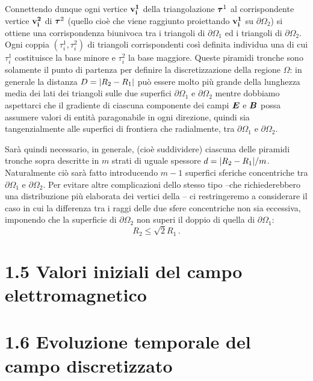 Connettendo dunque ogni vertice $\vb{v^1_i}$ della triangolazione $\vb*{\tau}^1$ al corrispondente vertice $\vb{v^2_i}$ di $\vb*{\tau}^2$ (quello cioè che viene raggiunto proiettando $\vb{v^1_i}$ su $\partial \Omega_2$) si ottiene una corrispondenza biunivoca tra i triangoli di $\partial \Omega_1$ ed i triangoli di $\partial \Omega_2$. Ogni coppia $(\tau^1_i, \tau^2_i)$ di triangoli corrispondenti così definita individua una  di cui $\tau^1_i$ costituisce la base minore e $\tau^2_i$ la base maggiore. Queste piramidi tronche sono solamente il punto di partenza per definire la discretizzazione della regione $\Omega$: in generale la distanza $D = \abs{R_2 - R_1}$ può essere molto più grande della lunghezza media dei lati dei triangoli sulle due superfici $\partial \Omega_1$ e $\partial \Omega_2$ mentre dobbiamo aspettarci che il gradiente di ciascuna componente dei campi $\vb*{E}$ e $\vb*{B}$ possa assumere valori di entità paragonabile in ogni direzione, quindi sia tangenzialmente alle superfici di frontiera che radialmente, tra $\partial \Omega_1$ e $\partial \Omega_2$.    

Sarà quindi necessario, in generale,  (cioè suddividere) ciascuna delle piramidi tronche sopra descritte in $m$ strati di uguale spessore $d  = \abs{R_2 - R_1}/m$. Naturalmente ciò sarà fatto introducendo $m-1$ superfici sferiche concentriche tra        
$\partial \Omega_1$ e $\partial \Omega_2$. Per evitare altre complicazioni dello stesso tipo --che richiederebbero una distribuzione più elaborata dei vertici della -- ci restringeremo a considerare il caso in cui la differenza tra i raggi delle due sfere concentriche non sia eccessiva, imponendo che la superficie di $\partial \Omega_2$ non superi il doppio di quella di $\partial \Omega_1$:  
$$R_2 \leq \sqrt{2} R_1\,.$$   


\section*{1.5 Valori iniziali del campo elettromagnetico}\label{sec_1.5}


\section*{1.6 Evoluzione temporale del campo discretizzato}\label{sec_1.6}

